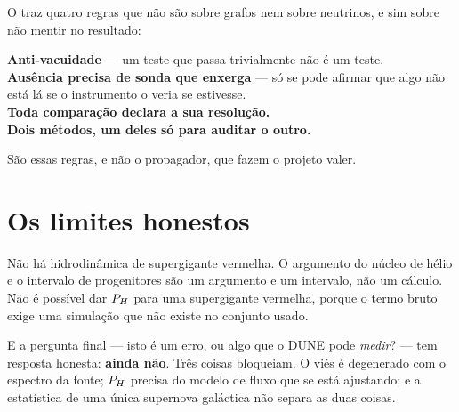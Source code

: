 \begin{conceito}
O  traz quatro regras que não são sobre grafos nem sobre
neutrinos, e sim sobre não mentir no resultado:

\smallskip
\textbf{Anti-vacuidade} --- um teste que passa trivialmente não é um teste.\\
\textbf{Ausência precisa de sonda que enxerga} --- só se pode afirmar que algo
não está lá se o instrumento o veria se estivesse.\\
\textbf{Toda comparação declara a sua resolução.}\\
\textbf{Dois métodos, um deles só para auditar o outro.}

\medskip
São essas regras, e não o propagador, que fazem o projeto valer.
\end{conceito}

\section{Os limites honestos}

Não há hidrodinâmica de supergigante vermelha. O argumento do núcleo de hélio e
o intervalo de progenitores são um argumento e um intervalo, não um cálculo. Não
é possível dar $P_H$ para uma supergigante vermelha, porque o termo bruto exige
uma simulação que não existe no conjunto usado.

E a pergunta final --- isto é um erro, ou algo que o DUNE pode \emph{medir}? --- tem
resposta honesta: \textbf{ainda não}. Três coisas bloqueiam. O viés é degenerado
com o espectro da fonte; $P_H$ precisa do modelo de fluxo que se está ajustando;
e a estatística de uma única supernova galáctica não separa as duas coisas.
